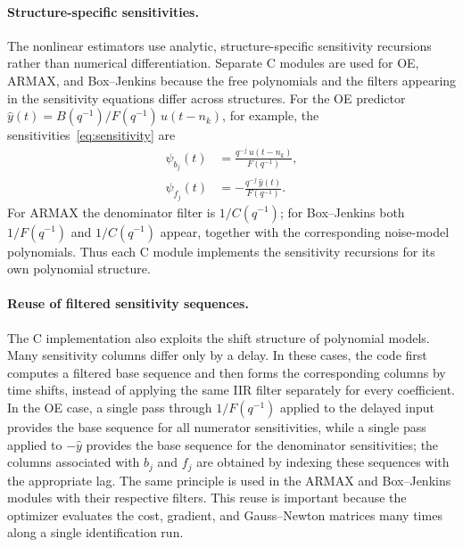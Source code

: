 \documentclass{ifacconf}
\begin{document}
\paragraph*{Structure-specific sensitivities.}
The nonlinear estimators use analytic, structure-specific sensitivity
recursions rather than numerical differentiation.  Separate C modules are
used for OE, ARMAX, and Box--Jenkins because the free polynomials and the
filters appearing in the sensitivity equations differ across structures.
For the OE predictor $\hat{y}(t) = B(q^{-1})/F(q^{-1})\,u(t-n_k)$,
for example, the sensitivities~\eqref{eq:sensitivity} are
\begin{align}
  \psi_{b_j}(t) &= \frac{q^{-j}\,u(t-n_k)}{F(q^{-1})},
                 \label{eq:sens-b} \\
  \psi_{f_j}(t) &= -\frac{q^{-j}\,\hat{y}(t)}{F(q^{-1})}.
                 \label{eq:sens-f}
\end{align}
For ARMAX the denominator filter is $1/C(q^{-1})$; for Box--Jenkins both
$1/F(q^{-1})$ and $1/C(q^{-1})$ appear, together with the corresponding
noise-model polynomials.  Thus each C module implements the sensitivity
recursions for its own polynomial structure.

\paragraph*{Reuse of filtered sensitivity sequences.}
The C implementation also exploits the shift structure of polynomial
models.  Many sensitivity columns differ only by a delay.  In these cases,
the code first computes a filtered base sequence and then forms the
corresponding columns by time shifts, instead of applying the same IIR
filter separately for every coefficient.  In the OE case, a single pass
through $1/F(q^{-1})$ applied to the delayed input provides the base
sequence for all numerator sensitivities, while a single pass applied to
$-\hat{y}$ provides the base sequence for the denominator sensitivities;
the columns associated with $b_j$ and $f_j$ are obtained by indexing these
sequences with the appropriate lag.  The same principle is used in the
ARMAX and Box--Jenkins modules with their respective filters.  This reuse is
important because the optimizer evaluates the cost, gradient, and
Gauss--Newton matrices many times along a single identification run.
\end{document}
